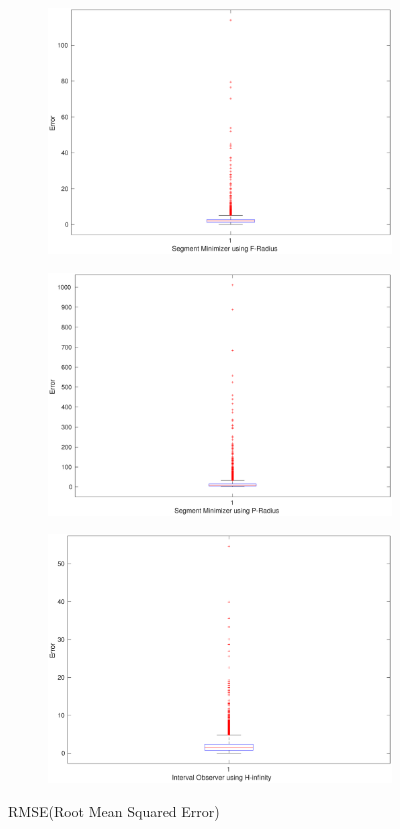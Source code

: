 \begin{figure}[h]\label{fig:boxplot}
\begin{subfigure}{\linewidth}
\centering
\includegraphics[width=.6\linewidth]{figures/Error/error_sm}
\end{subfigure}
\begin{subfigure}{\linewidth}
\centering
\includegraphics[width=.6\linewidth]{figures/Error/error_prad}
\end{subfigure}
\begin{subfigure}{\linewidth}
\centering
\includegraphics[width=.6\linewidth]{figures/Error/error_hinf}
\end{subfigure}
\caption{RMSE(Root Mean Squared Error)}
\end{figure}
%
